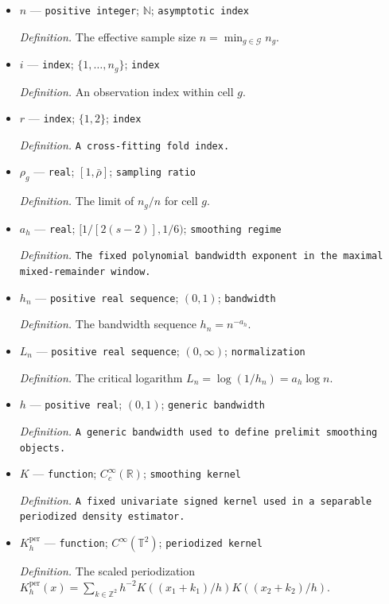 \documentclass{article}
\begin{document}
\begin{itemize}
  \item \(n\) --- \texttt{positive integer}; \(\mathbb N\); \texttt{asymptotic index}
  \par\smallskip\noindent\emph{Definition.} The effective sample size \(n=\min_{g\in\mathcal G}n_g\).
  \item \(i\) --- \texttt{index}; \(\{1,\ldots,n_g\}\); \texttt{index}
  \par\smallskip\noindent\emph{Definition.} An observation index within cell \(g\).
  \item \(r\) --- \texttt{index}; \(\{1,2\}\); \texttt{index}
  \par\smallskip\noindent\emph{Definition.} \texttt{A cross-\allowbreak{}fitting fold index.}
  \item \(\rho_g\) --- \texttt{real}; \([1,\bar\rho]\); \texttt{sampling ratio}
  \par\smallskip\noindent\emph{Definition.} The limit of \(n_g/n\) for cell \(g\).
  \item \(a_h\) --- \texttt{real}; \([1/[2(s-2)],1/6)\); \texttt{smoothing regime}
  \par\smallskip\noindent\emph{Definition.} \texttt{The fixed polynomial bandwidth exponent in the maximal mixed-\allowbreak{}remainder window.}
  \item \(h_n\) --- \texttt{positive real sequence}; \((0,1)\); \texttt{bandwidth}
  \par\smallskip\noindent\emph{Definition.} The bandwidth sequence \(h_n=n^{-a_h}\).
  \item \(L_n\) --- \texttt{positive real sequence}; \((0,\infty)\); \texttt{normalization}
  \par\smallskip\noindent\emph{Definition.} The critical logarithm \(L_n=\log(1/h_n)=a_h\log n\).
  \item \(h\) --- \texttt{positive real}; \((0,1)\); \texttt{generic bandwidth}
  \par\smallskip\noindent\emph{Definition.} \texttt{A generic bandwidth used to define prelimit smoothing objects.}
  \item \(K\) --- \texttt{function}; \(C_c^\infty(\mathbb R)\); \texttt{smoothing kernel}
  \par\smallskip\noindent\emph{Definition.} \texttt{A fixed univariate signed kernel used in a separable periodized density estimator.}
  \item \(K_h^{\mathrm{per}}\) --- \texttt{function}; \(C^\infty(\mathbb T^2)\); \texttt{periodized kernel}
  \par\smallskip\noindent\emph{Definition.} The scaled periodization \(K_h^{\mathrm{per}}(x)=\sum_{k\in\mathbb Z^2}h^{-2}K((x_1+k_1)/h)K((x_2+k_2)/h)\).

\end{itemize}
\end{document}
